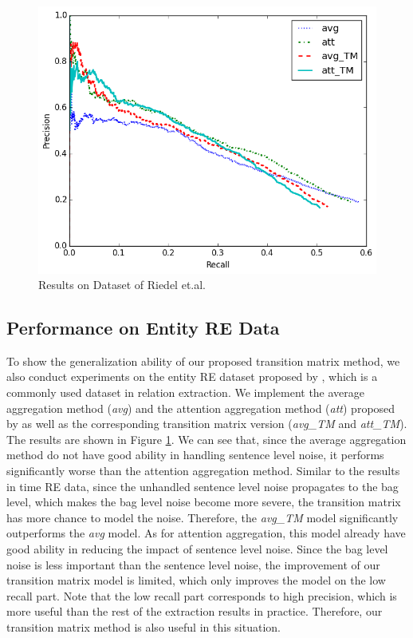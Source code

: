 \begin{figure}[htbp]
\includegraphics[width=0.9\linewidth]{figures/re_att_avg_cmp_exp.png}
\caption{Results on Dataset of Riedel et.al.}
\label{fig: Riedel_res}
\end{figure}

\subsection{Performance on Entity RE Data}
To show the generalization ability of our proposed transition matrix method, we also conduct experiments on the entity RE dataset proposed by \cite{riedel2010modeling}, which is a commonly used dataset in relation extraction. We implement the average aggregation method (\emph{avg}) and the attention aggregation method (\emph{att}) proposed by \cite{lin2016neural} as well as the corresponding transition matrix version (\emph{avg\_TM} and \emph{att\_TM}). The results are shown in Figure \ref{fig: Riedel_res}. We can see that, since the average aggregation method do not have good ability in handling sentence level noise, it performs significantly worse than the attention aggregation method. Similar to the results in time RE data, since the unhandled sentence level noise propagates to the bag level, which makes the bag level noise become more severe, the transition matrix has more chance to model the noise. Therefore, the \emph{avg\_TM} model significantly outperforms the \emph{avg} model. As for attention aggregation, this model already have good ability in reducing the impact of sentence level noise. Since the bag level noise is less important than the sentence level noise, the improvement of our transition matrix model is limited, which only improves the model on the low recall part. Note that the low recall part corresponds to high precision, which is more useful than the rest of the extraction results in practice. Therefore, our transition matrix method is also useful in this situation.

